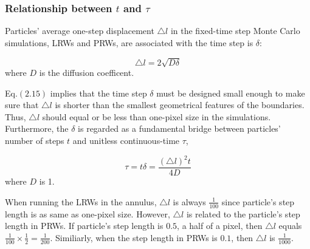 \subsubsection{Relationship between $t$ and $\tau$}

Particles' average one-step displacement $\triangle l$ in the
fixed-time step Monte Carlo simulations, LRWs and PRWs, are associated
with the time step is $\delta$:

\begin{equation}
  \triangle l = 2 \sqrt{D \delta}
\end{equation}
where $D$ is the diffusion coefficent.

Eq.$(2.15)$ implies that the time step $\delta$ must be designed small
enough to make sure that $\triangle l$ is shorter than the smallest
geometrical features of the boundaries. Thus, $\triangle l$ should
equal or be less than one-pixel size in the simulations. Furthermore,
the $\delta$ is regarded as a fundamental bridge between particles'
number of steps $t$ and unitless continuous-time $\tau$,

\begin{equation}
 \tau = t \delta = \frac{(\triangle l)^2 t}{4D}
\end{equation}
where $D$ is 1.

When running the LRWs in the annulus, $\triangle l$ is always
$\frac{1}{100}$ since particle's step length is as same as one-pixel
size. However, $\triangle l$ is related to the particle's step length
in PRWs. If particle's step length is $0.5$, a half of a pixel, then
$\triangle l$ equals $\frac{1}{100} \times \frac{1}{2} =
\frac{1}{200}$.  Similiarly, when the step length in PRWs is $0.1$,
then $\triangle l$ is $\frac{1}{1000}$. 

